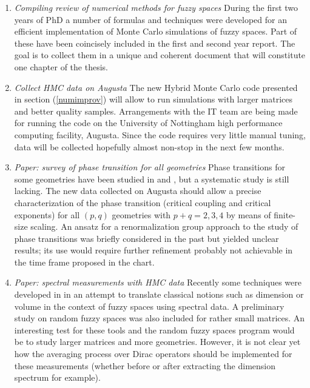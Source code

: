\begin{enumerate}
\item \textit{Compiling review of numerical methods for fuzzy spaces}\newline
During the first two years of PhD a number of formulas and techniques were developed for an efficient implementation of Monte Carlo simulations of fuzzy spaces. Part of these have been coincisely included in the first and second year report. The goal is to collect them in a unique and coherent document that will constitute one chapter of the thesis.
\item \textit{Collect HMC data on Augusta}\newline
The new Hybrid Monte Carlo code presented in section (\ref{numimprov}) will allow to run simulations with larger matrices and better quality samples. Arrangements with the IT team are being made for running the code on the University of Nottingham high performance computing facility, Augusta. Since the code requires very little manual tuning, data will be collected hopefully almost non-stop in the next few months. 
\item \textit{Paper: survey of phase transition for all geometries}\newline
Phase transitions for some geometries have been studied in \cite{barrettglaser} and \cite{glaser}, but a systematic study is still lacking. The new data collected on Augusta should allow a precise characterization of the phase transition (critical coupling and critical exponents) for all $(p,q)$ geometries with $p+q = 2,3,4$ by means of finite-size scaling. An ansatz for a renormalization group approach to the study of phase transitions was briefly considered in the past but yielded unclear results; its use would require further refinement probably not achievable in the time frame proposed in the chart.
\item \textit{Paper: spectral measurements with HMC data}\newline
Recently some techniques were developed in \cite{barrdruceglaser} in an attempt to translate classical notions such as dimension or volume in the context of fuzzy spaces using spectral data. A preliminary study on random fuzzy spaces was also included for rather small matrices. An interesting test for these tools and the random fuzzy spaces program would be to study larger matrices and more geometries. However, it is not clear yet how the averaging process over Dirac operators should be implemented for these measurements (whether before or after extracting the dimension spectrum for example). 

\end{enumerate}
